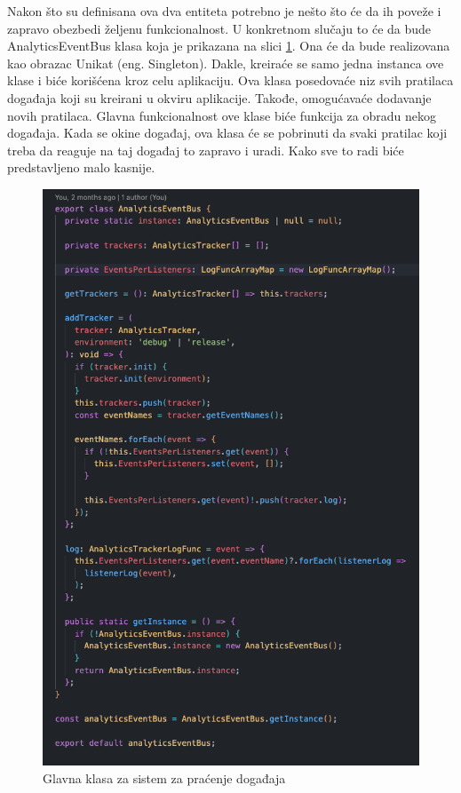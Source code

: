 \documentclass[12pt,oneside]{memoir}
\begin{document}
Nakon što su definisana ova dva entiteta potrebno je nešto što će da ih poveže i zapravo obezbedi željenu funkcionalnost. U konkretnom slučaju to će da bude AnalyticsEventBus klasa koja je prikazana na slici \ref{fig:analyticsEventBus}. Ona će da bude realizovana kao obrazac Unikat\cite{singleton} (eng. Singleton). Dakle, kreiraće se samo jedna instanca ove klase i biće korišćena kroz celu aplikaciju. Ova klasa posedovaće niz svih pratilaca događaja koji su kreirani u okviru aplikacije. Takođe, omogućavaće dodavanje novih pratilaca. Glavna funkcionalnost ove klase biće funkcija za obradu nekog događaja. Kada se okine događaj, ova klasa će se pobrinuti da svaki pratilac koji treba da reaguje na taj događaj to zapravo i uradi. Kako sve to radi biće predstavljeno malo kasnije.

\begin{figure}[h!]
\centering
\includegraphics[scale=0.45]{docs/images/chapterSix/analyticsEventBus.png}
\caption{Glavna klasa za sistem za praćenje događaja}
\label{fig:analyticsEventBus}
\end{figure}
\end{document}
